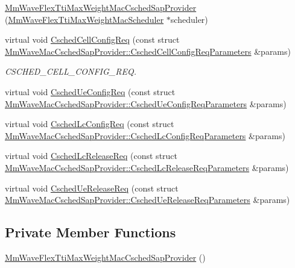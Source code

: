 \begin{DoxyCompactItemize}
\item 
\hyperlink{classns3_1_1MmWaveFlexTtiMaxWeightMacCschedSapProvider_a062f39dc9bcac64a243889cdf99ecb11}{Mm\+Wave\+Flex\+Tti\+Max\+Weight\+Mac\+Csched\+Sap\+Provider} (\hyperlink{classns3_1_1MmWaveFlexTtiMaxWeightMacScheduler}{Mm\+Wave\+Flex\+Tti\+Max\+Weight\+Mac\+Scheduler} $\ast$scheduler)
\item 
virtual void \hyperlink{classns3_1_1MmWaveFlexTtiMaxWeightMacCschedSapProvider_a948e6bb03e7f3cd6bfa640b08caad083}{Csched\+Cell\+Config\+Req} (const struct \hyperlink{structns3_1_1MmWaveMacCschedSapProvider_1_1CschedCellConfigReqParameters}{Mm\+Wave\+Mac\+Csched\+Sap\+Provider\+::\+Csched\+Cell\+Config\+Req\+Parameters} \&params)
\begin{DoxyCompactList}\small\item\em C\+S\+C\+H\+E\+D\+\_\+\+C\+E\+L\+L\+\_\+\+C\+O\+N\+F\+I\+G\+\_\+\+R\+EQ. \end{DoxyCompactList}\item 
virtual void \hyperlink{classns3_1_1MmWaveFlexTtiMaxWeightMacCschedSapProvider_a803629bd4166f4300ce7064bc0ced9fc}{Csched\+Ue\+Config\+Req} (const struct \hyperlink{structns3_1_1MmWaveMacCschedSapProvider_1_1CschedUeConfigReqParameters}{Mm\+Wave\+Mac\+Csched\+Sap\+Provider\+::\+Csched\+Ue\+Config\+Req\+Parameters} \&params)
\item 
virtual void \hyperlink{classns3_1_1MmWaveFlexTtiMaxWeightMacCschedSapProvider_aeb959b491d3e4ed7582a784c0bf05bc0}{Csched\+Lc\+Config\+Req} (const struct \hyperlink{structns3_1_1MmWaveMacCschedSapProvider_1_1CschedLcConfigReqParameters}{Mm\+Wave\+Mac\+Csched\+Sap\+Provider\+::\+Csched\+Lc\+Config\+Req\+Parameters} \&params)
\item 
virtual void \hyperlink{classns3_1_1MmWaveFlexTtiMaxWeightMacCschedSapProvider_a3d4edaf3f49882334c7e20f628d4e0a7}{Csched\+Lc\+Release\+Req} (const struct \hyperlink{structns3_1_1MmWaveMacCschedSapProvider_1_1CschedLcReleaseReqParameters}{Mm\+Wave\+Mac\+Csched\+Sap\+Provider\+::\+Csched\+Lc\+Release\+Req\+Parameters} \&params)
\item 
virtual void \hyperlink{classns3_1_1MmWaveFlexTtiMaxWeightMacCschedSapProvider_a677e8b63178a2d89517eb5b42e385a04}{Csched\+Ue\+Release\+Req} (const struct \hyperlink{structns3_1_1MmWaveMacCschedSapProvider_1_1CschedUeReleaseReqParameters}{Mm\+Wave\+Mac\+Csched\+Sap\+Provider\+::\+Csched\+Ue\+Release\+Req\+Parameters} \&params)
\end{DoxyCompactItemize}
\subsection*{Private Member Functions}
\begin{DoxyCompactItemize}
\item 
\hyperlink{classns3_1_1MmWaveFlexTtiMaxWeightMacCschedSapProvider_ae1aac47d8aa5924300540605182ccf79}{Mm\+Wave\+Flex\+Tti\+Max\+Weight\+Mac\+Csched\+Sap\+Provider} ()
\end{DoxyCompactItemize}
